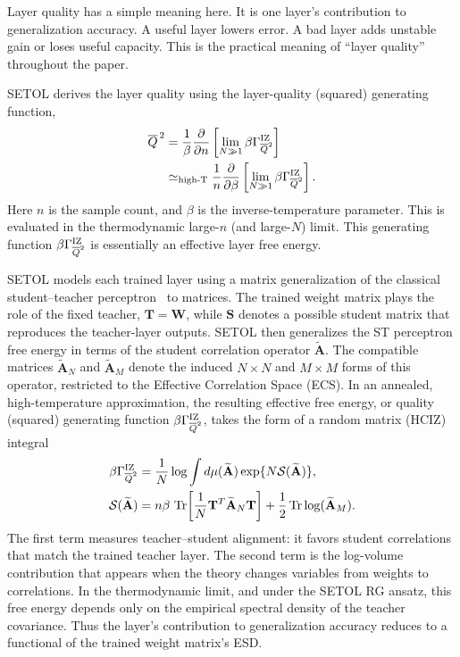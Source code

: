 \documentclass[10pt,twocolumn]{article}
\newcommand{\Tr}{\operatorname{Tr}}
\newcommand{\IZQ}{\beta\Gamma_{\overline Q^2}^{\rm IZ}}
\begin{document}
Layer quality has a simple meaning here. It is one layer's contribution to generalization accuracy. A useful layer lowers error. A bad layer adds unstable gain or loses useful capacity.
This is the practical meaning of ``layer quality'' throughout the paper.

SETOL derives the layer quality using the layer-quality (squared) generating function,
\begin{equation}
\begin{aligned}
\overline Q^{\,2}
&=\frac{1}{\beta}\frac{\partial}{\partial n}
  \left[\lim_{N\gg1}\IZQ\right] \\
&\simeq_{\rm high\text{-}T}
  \frac{1}{n}\frac{\partial}{\partial\beta}
  \left[\lim_{N\gg1}\IZQ\right] .
\end{aligned}
\label{eq:setol_q_derivative}
\end{equation}
Here $n$ is the sample count, and $\beta$ is the inverse-temperature parameter.
This is evaluated in the thermodynamic large-$n$ (and large-$N$) limit.
This generating function $\IZQ$ is essentially an effective layer free energy.

SETOL models each trained layer using a matrix generalization of the classical student--teacher perceptron~\cite{SeungSompolinskyTishby1992} to matrices.
The trained weight matrix plays the role of the fixed teacher, $\mathbf T=\mathbf W$, while $\mathbf S$ denotes a possible student matrix that reproduces the teacher-layer outputs.
SETOL then generalizes the ST perceptron free energy in terms of the student correlation operator $\widetilde{\mathbf A}$. The compatible matrices $\widetilde{\mathbf A}_N$ and $\widetilde{\mathbf A}_M$ denote the induced $N\times N$ and $M\times M$ forms of this operator, restricted to the Effective Correlation Space (ECS). In an annealed, high-temperature approximation, the resulting effective free energy,
or quality (squared) generating function $\IZQ$, takes the form of a random matrix (HCIZ) integral
\begin{equation}
\begin{aligned}
\IZQ
&=\frac{1}{N}\log\int d\mu(\widetilde{\mathbf A})
   \exp\{N\mathcal S(\widetilde{\mathbf A})\},\\
\mathcal S(\widetilde{\mathbf A})
&=n\beta\,\Tr\!\left[
   \frac{1}{N}\mathbf T^T\widetilde{\mathbf A}_{N}\mathbf T
   \right]
   +\frac{1}{2}\Tr\log(\widetilde{\mathbf A}_{M}) .
\end{aligned}
\label{eq:setol_hciz}
\end{equation}
The first term measures teacher--student alignment: it favors student correlations that match the trained teacher layer. The second term is the log-volume contribution that appears when the theory changes variables from weights to correlations. In the thermodynamic limit, and under the SETOL RG ansatz, this free energy depends only on the empirical spectral density of the teacher covariance.
Thus the layer's contribution to generalization accuracy reduces to a functional of the trained weight matrix's ESD.
\end{document}
